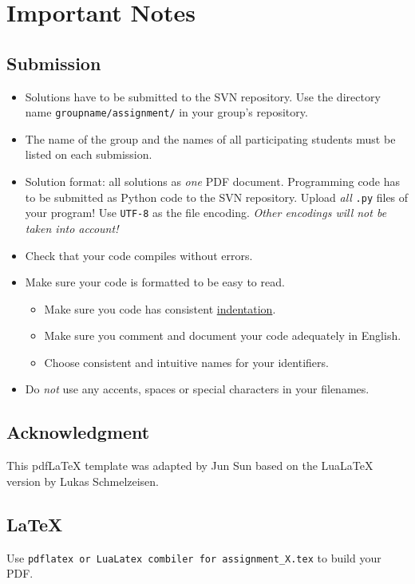  \section*{Important Notes}


  \subsection*{Submission}

  \begin{itemize}
    \item Solutions have to be submitted to the SVN repository.
      Use the directory name \texttt{groupname/assignment\@assignmentnumber{}/}
      in your group's repository.
    \item The name of the group and the names of all participating students must
      be listed on each submission.
      
    \item Solution format: all solutions as \emph{one} PDF document.
      Programming code has to be submitted as Python code to the SVN repository.
      Upload \emph{all} \texttt{.py} files of your program!
      Use \texttt{UTF-8} as the file encoding.
      \emph{Other encodings will not be taken into account!}
    \item Check that your code compiles without errors.
    \item Make sure your code is formatted to be easy to read.
      \begin{itemize}
        \item Make sure you code  has consistent
          \href{https://en.wikipedia.org/wiki/Indent_style}{indentation}.
        \item Make sure you comment and document your code
          adequately in English.
        \item Choose consistent and intuitive names for your identifiers.
      \end{itemize}
    \item Do \emph{not} use any accents, spaces or special characters in your
      filenames.
  \end{itemize}

  \subsection*{Acknowledgment}
	
    This pdfLaTeX template was adapted by Jun Sun based on the LuaLaTeX version by Lukas Schmelzeisen. 

\subsection*{\LaTeX}
Use \texttt{pdflatex or LuaLatex combiler for  assignment\_X.tex}  to build your PDF.
